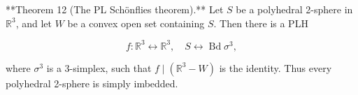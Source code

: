 **Theorem 12 (The PL Schönflies theorem).** Let $S$ be a polyhedral 2-sphere in $\mathbb{R}^3$, and let $W$ be a convex open set containing $S$. Then there is a PLH

$$f: \mathbb{R}^3 \leftrightarrow \mathbb{R}^3, \quad S \leftrightarrow \operatorname{Bd} \sigma^3,$$

where $\sigma^3$ is a 3-simplex, such that $f \mid (\mathbb{R}^3 - W)$ is the identity. Thus every polyhedral 2-sphere is simply imbedded.
